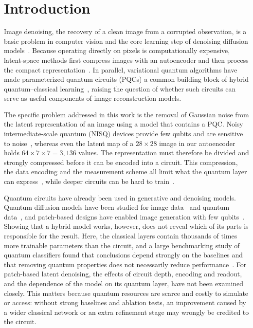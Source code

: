 \documentclass[runningheads]{llncs}
\begin{document}
\section{Introduction}\label{sec:intro}
Image denoising, the recovery of a clean image from a corrupted observation, is a basic problem in computer vision and the core learning step of denoising diffusion models~\cite{ho}. Because operating directly on pixels is computationally expensive, latent-space methods first compress images with an autoencoder and then process the compact representation~\cite{rombach}. In parallel, variational quantum algorithms have made parameterized quantum circuits (PQCs) a common building block of hybrid quantum--classical learning~\cite{cerezo,benedetti}, raising the question of whether such circuits can serve as useful components of image reconstruction models.

The specific problem addressed in this work is the removal of Gaussian noise from the latent representation of an image using a model that contains a PQC. Noisy intermediate-scale quantum (NISQ) devices provide few qubits and are sensitive to noise~\cite{preskill}, whereas even the latent map of a $28\times28$ image in our autoencoder holds $64\times7\times7=3{,}136$ values. The representation must therefore be divided and strongly compressed before it can be encoded into a circuit. This compression, the data encoding and the measurement scheme all limit what the quantum layer can express~\cite{havlicek,schuld}, while deeper circuits can be hard to train~\cite{mcclean}.

Quantum circuits have already been used in generative and denoising models. Quantum diffusion models have been studied for image data~\cite{kolle,cacioppo} and quantum data~\cite{zhang}, and patch-based designs have enabled image generation with few qubits~\cite{huang}. Showing that a hybrid model works, however, does not reveal which of its parts is responsible for the result. Here, the classical layers contain thousands of times more trainable parameters than the circuit, and a large benchmarking study of quantum classifiers found that conclusions depend strongly on the baselines and that removing quantum properties does not necessarily reduce performance~\cite{bowles}. For patch-based latent denoising, the effects of circuit depth, encoding and readout, and the dependence of the model on its quantum layer, have not been examined closely. This matters because quantum resources are scarce and costly to simulate or access: without strong baselines and ablation tests, an improvement caused by a wider classical network or an extra refinement stage may wrongly be credited to the circuit.
\end{document}
